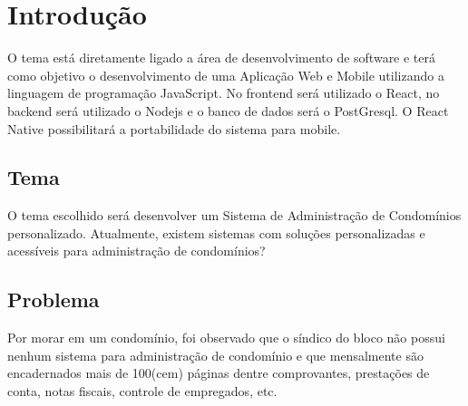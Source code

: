 \chapter{Introdução}
\label{chp:introduction}
O tema está diretamente ligado a área de desenvolvimento de software e terá como
objetivo o desenvolvimento de uma Aplicação Web e Mobile utilizando a linguagem
de programação JavaScript. No frontend será utilizado o React, no backend será
utilizado o Nodejs e o banco de dados será o PostGresql. O React Native
possibilitará a portabilidade do sistema para mobile.
\section{Tema}
O tema escolhido será desenvolver um Sistema de Administração de Condomínios
personalizado. Atualmente, existem sistemas com soluções personalizadas e acessíveis
para administração de condomínios?
\section{Problema}
Por morar em um condomínio, foi observado que o síndico do bloco não possui
nenhum sistema para administração de condomínio e que mensalmente são encadernados
mais de 100(cem) páginas dentre comprovantes, prestações de conta, notas fiscais,
controle de empregados, etc.

